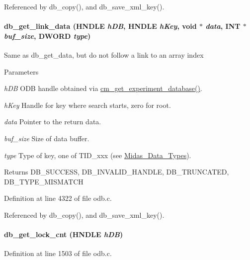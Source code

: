 Referenced by db\_\-copy(), and db\_\-save\_\-xml\_\-key().
\paragraph[{db\_\-get\_\-link\_\-data}]{ db\_\-get\_\-link\_\-data (HNDLE {\em hDB}, \/  HNDLE {\em hKey}, \/  void $\ast$ {\em data}, \/  {\bf INT} $\ast$ {\em buf\_\-size}, \/  {\bf DWORD} {\em type})}\hfill\label{group__odbfunctionc_gaf07dd1abe9b9f63238c9b1d9a3bd5cc0}
Same as db\_\-get\_\-data, but do not follow a link to an array index


\begin{DoxyParams}{Parameters}
\item[{\em hDB}]ODB handle obtained via \hyperlink{group__cmfunctionc_ga16b33b70783a3f5ba98b4094149d12b7}{cm\_\-get\_\-experiment\_\-database()}. \item[{\em hKey}]Handle for key where search starts, zero for root. \item[{\em data}]Pointer to the return data. \item[{\em buf\_\-size}]Size of data buffer. \item[{\em type}]Type of key, one of TID\_\-xxx (see \hyperlink{F_Midas_Code_and_Libraries_Midas_Data_Types}{Midas\_\-Data\_\-Types}). \end{DoxyParams}
\begin{DoxyReturn}{Returns}
DB\_\-SUCCESS, DB\_\-INVALID\_\-HANDLE, DB\_\-TRUNCATED, DB\_\-TYPE\_\-MISMATCH 
\end{DoxyReturn}


Definition at line 4322 of file odb.c.

Referenced by db\_\-copy(), and db\_\-save\_\-xml\_\-key().
\paragraph[{db\_\-get\_\-lock\_\-cnt}]{ db\_\-get\_\-lock\_\-cnt (HNDLE {\em hDB})}\hfill\label{group__odbfunctionc_gae1aa78c5834dd17ee282e9289c5c482a}


Definition at line 1503 of file odb.c.
